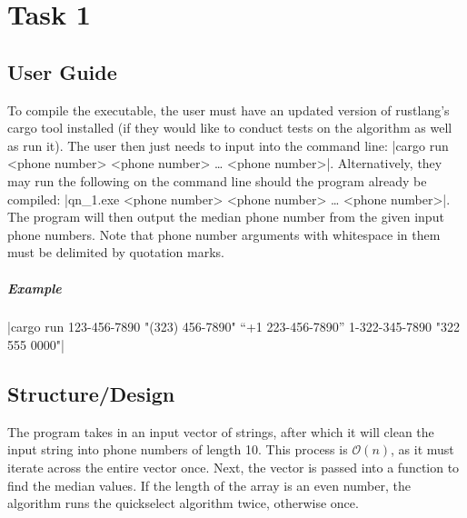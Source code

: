 \documentclass{report}
\begin{document}
\chapter{Task 1}
\section{User Guide}
To compile the executable, the user must have an updated version of rustlang's cargo tool installed (if they would like to conduct tests on the algorithm as well as run it). The user then just needs to input into the command line: |cargo run <phone number> <phone number> … <phone number>|. Alternatively, they may run the following on the command line should the program already be compiled: |qn_1.exe <phone number> <phone number> … <phone number>|. The program will then output the median phone number from the given input phone numbers. Note that phone number arguments with whitespace in them must be delimited by quotation marks.
\paragraph{Example} |cargo run 123-456-7890 "(323) 456-7890" “+1 223-456-7890” 1-322-345-7890 "322 555 0000"|

\section{Structure/Design}
The program takes in an input vector of strings, after which it will clean the input string into phone numbers of length 10. This process is \(\mathcal{O}(n)\), as it must iterate across the entire vector once. Next, the vector is passed into a function to find the median values. If the length of the array is an even number, the algorithm runs the quickselect algorithm twice, otherwise once.
\end{document}
